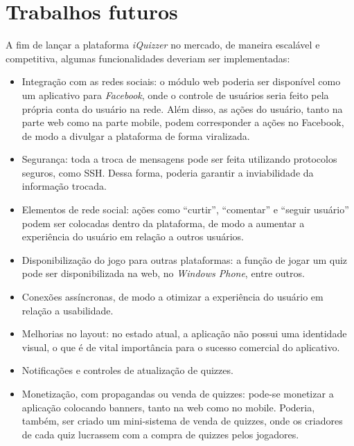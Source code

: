  
\section{Trabalhos futuros}
	A fim de lançar a plataforma \emph{iQuizzer} no mercado, de maneira escalável e competitiva, algumas funcionalidades deveriam ser implementadas:
\begin{itemize}
\item Integração com as redes sociais: o módulo web poderia ser disponível como um aplicativo para \emph{Facebook}, onde o controle de usuários seria feito pela própria conta do usuário na rede. Além disso, as ações do usuário, tanto na parte web como na parte mobile, podem corresponder a ações no Facebook, de modo a divulgar a plataforma de forma viralizada.
\item Segurança: toda a troca de mensagens pode ser feita utilizando protocolos seguros, como \ac{SSH}. Dessa forma, poderia garantir a inviabilidade da informação trocada.
\item Elementos de rede social: ações como ``curtir'', ``comentar'' e ``seguir usuário'' podem ser colocadas dentro da plataforma, de modo a aumentar a experiência do usuário em relação a outros usuários.
\item Disponibilização do jogo para outras plataformas: a função de jogar um quiz pode ser disponibilizada na web, no \emph{Windows Phone}, entre outros.
\item Conexões assíncronas, de modo a otimizar a experiência do usuário em relação a usabilidade.
\item Melhorias no layout: no estado atual, a aplicação não possui uma identidade visual, o que é de vital importância para o sucesso comercial do aplicativo.
\item Notificações e controles de atualização de quizzes.
\item Monetização, com propagandas ou venda de quizzes: pode-se monetizar a aplicação colocando banners, tanto na web como no mobile. Poderia, também, ser criado um mini-sistema de venda de quizzes, onde os criadores de cada quiz lucrassem com a compra de quizzes pelos jogadores.
\end{itemize}
